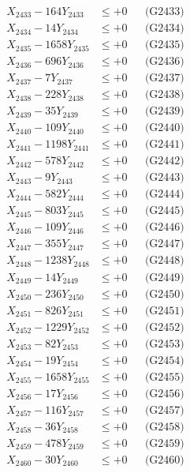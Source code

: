 \documentclass[a4paper,10pt]{article}
\begin{document}
{\begin{align}
X_{2433} - 164Y_{2433} &\leq +0 && \text{(G2433)} \\
X_{2434} - 14Y_{2434} &\leq +0 && \text{(G2434)} \\
X_{2435} - 1658Y_{2435} &\leq +0 && \text{(G2435)} \\
X_{2436} - 696Y_{2436} &\leq +0 && \text{(G2436)} \\
X_{2437} - 7Y_{2437} &\leq +0 && \text{(G2437)} \\
X_{2438} - 228Y_{2438} &\leq +0 && \text{(G2438)} \\
X_{2439} - 35Y_{2439} &\leq +0 && \text{(G2439)} \\
X_{2440} - 109Y_{2440} &\leq +0 && \text{(G2440)} \\
\allowbreak
X_{2441} - 1198Y_{2441} &\leq +0 && \text{(G2441)} \\
X_{2442} - 578Y_{2442} &\leq +0 && \text{(G2442)} \\
X_{2443} - 9Y_{2443} &\leq +0 && \text{(G2443)} \\
X_{2444} - 582Y_{2444} &\leq +0 && \text{(G2444)} \\
X_{2445} - 803Y_{2445} &\leq +0 && \text{(G2445)} \\
X_{2446} - 109Y_{2446} &\leq +0 && \text{(G2446)} \\
X_{2447} - 355Y_{2447} &\leq +0 && \text{(G2447)} \\
X_{2448} - 1238Y_{2448} &\leq +0 && \text{(G2448)} \\
X_{2449} - 14Y_{2449} &\leq +0 && \text{(G2449)} \\
X_{2450} - 236Y_{2450} &\leq +0 && \text{(G2450)} \\
\allowbreak
X_{2451} - 826Y_{2451} &\leq +0 && \text{(G2451)} \\
X_{2452} - 1229Y_{2452} &\leq +0 && \text{(G2452)} \\
X_{2453} - 82Y_{2453} &\leq +0 && \text{(G2453)} \\
X_{2454} - 19Y_{2454} &\leq +0 && \text{(G2454)} \\
X_{2455} - 1658Y_{2455} &\leq +0 && \text{(G2455)} \\
X_{2456} - 17Y_{2456} &\leq +0 && \text{(G2456)} \\
X_{2457} - 116Y_{2457} &\leq +0 && \text{(G2457)} \\
X_{2458} - 36Y_{2458} &\leq +0 && \text{(G2458)} \\
X_{2459} - 478Y_{2459} &\leq +0 && \text{(G2459)} \\
X_{2460} - 30Y_{2460} &\leq +0 && \text{(G2460)} \\

\end{align}}
\end{document}
